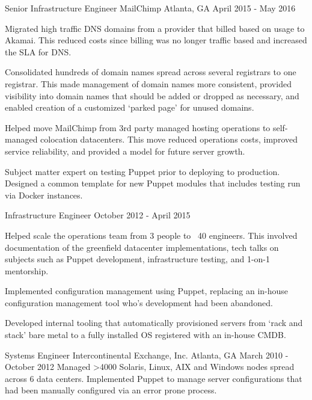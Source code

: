 \begin{cventries}
  \cventry
    {Senior Infrastructure Engineer} %
    {MailChimp} %
    {Atlanta, GA} %
    {April 2015 - May 2016} %
    {
      \begin{cvitems} %
        \item {Migrated high traffic DNS domains from a provider that billed based on usage to Akamai. This reduced costs since billing was no longer traffic based and increased the SLA for DNS.}
        \item {Consolidated hundreds of domain names spread across several registrars to one registrar. This made management of domain names more consistent, provided visibility into domain names that should be added or dropped as necessary, and enabled creation of a customized `parked page' for unused domains.}
        \item {Helped move MailChimp from 3rd party managed hosting operations to self-managed colocation datacenters. This move reduced operations costs, improved service reliability, and provided a model for future server growth.}
        \item {Subject matter expert on testing Puppet prior to deploying to production. Designed a common template for new Puppet modules that includes testing run via Docker instances.}
      \end{cvitems}
    }

  \cventry
    {Infrastructure Engineer} %
    {} %
    {} %
    {October 2012 - April 2015} %
    {
      \begin{cvitems} %
        \item {Helped scale the operations team from 3 people to ~40 engineers. This involved documentation of the greenfield datacenter implementations, tech talks on subjects such as Puppet development, infrastructure testing, and 1-on-1 mentorship.}
        \item {Implemented configuration management using Puppet, replacing an in-house configuration management tool who's development had been abandoned.}
        \item {Developed internal tooling that automatically provisioned servers from `rack and stack' bare metal to a fully installed OS registered with an in-house CMDB.}
      \end{cvitems}
    }

  \cventry
    {Systems Engineer} %
    {Intercontinental Exchange, Inc.} %
    {Atlanta, GA} %
    {March 2010 - October 2012} %
    {Managed >4000 Solaris, Linux, AIX and Windows nodes spread across 6 data centers. Implemented Puppet to manage server configurations that had been manually configured via an error prone process.}


\end{cventries}
